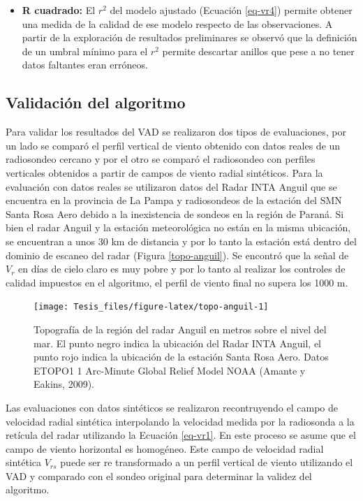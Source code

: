 \documentclass[12pt,spanish,oneside, a4paper]{book}
\providecommand{\tightlist}{%
  \setlength{\itemsep}{0pt}\setlength{\parskip}{0pt}}
\begin{document}
\begin{itemize}
\tightlist
\item
  \textbf{R cuadrado:} El \(r^2\) del modelo ajustado (Ecuación
  \ref{eq-vr4}) permite obtener una medida de la calidad de ese modelo
  respecto de las observaciones. A partir de la exploración de
  resultados preliminares se observó que la definición de un umbral
  mínimo para el \(r^2\) permite descartar anillos que pese a no tener
  datos faltantes eran erróneos.
\end{itemize}

\subsection{Validación del algoritmo}\label{validacion-del-algoritmo}

Para validar los resultados del VAD se realizaron dos tipos de
evaluaciones, por un lado se comparó el perfil vertical de viento
obtenido con datos reales de un radiosondeo cercano y por el otro se
comparó el radiosondeo con perfiles verticales obtenidos a partir de
campos de viento radial sintéticos. Para la evaluación con datos reales
se utilizaron datos del Radar INTA Anguil que se encuentra en la
provincia de La Pampa y radiosondeos de la estación del SMN Santa Rosa
Aero debido a la inexistencia de sondeos en la región de Paraná. Si bien
el radar Anguil y la estación meteorológica no están en la misma
ubicación, se encuentran a unos 30 km de distancia y por lo tanto la
estación está dentro del dominio de escaneo del radar (Figura
\ref{topo-anguil}). Se encontró que la señal de \(V_r\) en días de cielo
claro es muy pobre y por lo tanto al realizar los controles de calidad
impuestos en el algoritmo, el perfil de viento final no supera los 1000
m.

\begin{figure}

{\centering \texttt{[image: Tesis\_files/figure-latex/topo-anguil-1]} 

}

\caption{Topografía de la región del radar Anguil en metros sobre el nivel del mar. El punto negro indica la ubicación del Radar INTA Anguil, el punto rojo indica la ubicación de la estación Santa Rosa Aero. Datos ETOPO1 1 Arc-Minute Global Relief Model NOAA (Amante y Eakins, 2009). \label{topo-anguil}}\label{fig:topo-anguil}
\end{figure}

Las evaluaciones con datos sintéticos se realizaron recontruyendo el
campo de velocidad radial sintética interpolando la velocidad medida por
la radiosonda a la retícula del radar utilizando la Ecuación
\ref{eq-vr1}. En este proceso se asume que el campo de viento horizontal
es homogéneo. Este campo de velocidad radial sintética \(V_{rs}\) puede
ser re transformado a un perfil vertical de viento utilizando el VAD y
comparado con el sondeo original para determinar la validez del
algoritmo.
\end{document}
